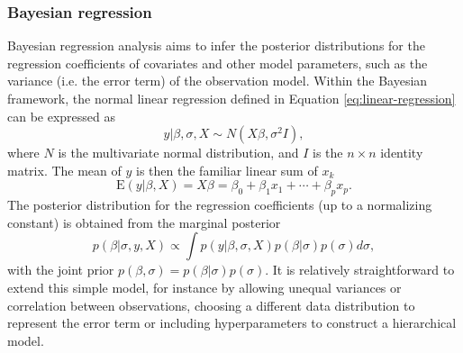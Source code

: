 \subsubsection{Bayesian regression}

Bayesian regression analysis aims to infer the posterior distributions
for the regression coefficients of covariates and other model parameters,
such as the variance (i.e. the error term) of the observation model.
Within the Bayesian framework, the normal linear regression defined in
Equation \ref{eq:linear-regression} can be expressed as
\begin{equation}
  y | \beta, \sigma, X \sim N(X \beta, \sigma^2I),
  \label{eq:bayesian-linear-regression}
\end{equation}
where $N$ is the multivariate normal distribution, and $I$ is the $n \times n$
identity matrix. The mean of $y$ is then the familiar linear sum of $x_k$
\begin{equation}
  \textrm{E}(y|\beta,X) = X \beta = \beta_0 + \beta_1 x_1 + \dotsb + \beta_p x_p.
\end{equation}
The posterior distribution for the regression coefficients (up to a
normalizing constant) is obtained from the marginal posterior
\begin{equation}
  p(\beta | \sigma, y, X) \propto \int p(y | \beta, \sigma, X) p(\beta | \sigma) p(\sigma) d\sigma,
\end{equation}
with the joint prior $p(\beta, \sigma) = p(\beta | \sigma) p(\sigma)$.
It is relatively straightforward to extend this simple model, for instance by
allowing unequal variances or correlation between observations, choosing a
different data distribution
to represent the error term or including hyperparameters to construct a
hierarchical model.

